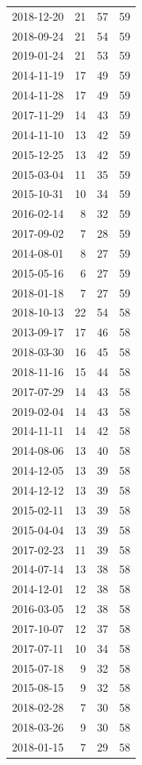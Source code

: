 \begin{tabular}{lrrr}
2018-12-20 & 21 & 57 & 59 \\
2018-09-24 & 21 & 54 & 59 \\
2019-01-24 & 21 & 53 & 59 \\
2014-11-19 & 17 & 49 & 59 \\
2014-11-28 & 17 & 49 & 59 \\
2017-11-29 & 14 & 43 & 59 \\
2014-11-10 & 13 & 42 & 59 \\
2015-12-25 & 13 & 42 & 59 \\
2015-03-04 & 11 & 35 & 59 \\
2015-10-31 & 10 & 34 & 59 \\
2016-02-14 & 8 & 32 & 59 \\
2017-09-02 & 7 & 28 & 59 \\
2014-08-01 & 8 & 27 & 59 \\
2015-05-16 & 6 & 27 & 59 \\
2018-01-18 & 7 & 27 & 59 \\
2018-10-13 & 22 & 54 & 58 \\
2013-09-17 & 17 & 46 & 58 \\
2018-03-30 & 16 & 45 & 58 \\
2018-11-16 & 15 & 44 & 58 \\
2017-07-29 & 14 & 43 & 58 \\
2019-02-04 & 14 & 43 & 58 \\
2014-11-11 & 14 & 42 & 58 \\
2014-08-06 & 13 & 40 & 58 \\
2014-12-05 & 13 & 39 & 58 \\
2014-12-12 & 13 & 39 & 58 \\
2015-02-11 & 13 & 39 & 58 \\
2015-04-04 & 13 & 39 & 58 \\
2017-02-23 & 11 & 39 & 58 \\
2014-07-14 & 13 & 38 & 58 \\
2014-12-01 & 12 & 38 & 58 \\
2016-03-05 & 12 & 38 & 58 \\
2017-10-07 & 12 & 37 & 58 \\
2017-07-11 & 10 & 34 & 58 \\
2015-07-18 & 9 & 32 & 58 \\
2015-08-15 & 9 & 32 & 58 \\
2018-02-28 & 7 & 30 & 58 \\
2018-03-26 & 9 & 30 & 58 \\
2018-01-15 & 7 & 29 & 58 \\

\end{tabular}

